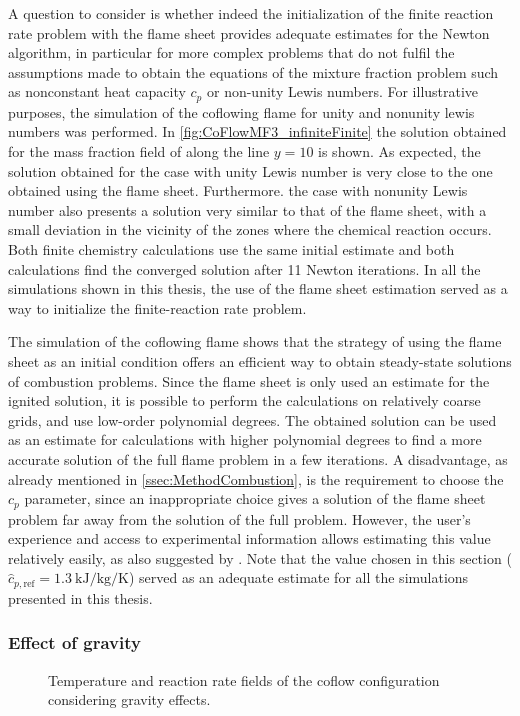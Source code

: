 A question to consider is whether indeed the initialization of the finite reaction rate problem with the flame sheet provides adequate estimates for the Newton algorithm, in particular for more complex problems that do not fulfil the assumptions made to obtain the equations of the mixture fraction problem such as nonconstant heat capacity $c_p$ or non-unity Lewis numbers. 
For illustrative purposes, the simulation of the coflowing flame for unity and nonunity lewis numbers was performed. In \cref{fig:CoFlowMF3_infiniteFinite} the solution obtained for the mass fraction field of  along the line $y=10$ is shown. As expected, the solution obtained for the case with unity Lewis number is very close to the one obtained using the flame sheet. Furthermore. the case with nonunity Lewis number also presents a solution very similar to that of the flame sheet, with a small deviation in the vicinity of the zones where the chemical reaction occurs.  Both finite chemistry calculations use the same initial estimate and both calculations find the converged solution after 11 Newton iterations.
In all the simulations shown in this thesis, the use of the flame sheet estimation served as a way to initialize the finite-reaction rate problem.

The simulation of the coflowing flame shows that the strategy of using the flame sheet as an initial condition offers an efficient way to obtain steady-state solutions of combustion problems. Since the flame sheet is only used an estimate for the ignited solution, it is possible to perform the calculations on relatively coarse grids, and use low-order polynomial degrees. The obtained solution can be used as an estimate for calculations with higher polynomial degrees to find a more accurate solution of the full flame problem in a few iterations. A disadvantage, as already mentioned in \cref{ssec:MethodCombustion}, is the requirement to choose  the $c_p$ parameter, since an inappropriate choice gives a solution of the flame sheet problem far away from the solution of the full problem. However, the user's experience and access to experimental information allows estimating this value relatively easily, as also suggested by \cite{smookeNumericalSolutionTwoDimensional1986a}. Note that the value chosen in this section ($\hat{c}_{p,\text{ref}}= \SI{1.3}{\kilo \joule \per \kilo \gram \per \kelvin}$)  served as an adequate estimate for all the simulations presented in this thesis.  

\subsubsection{Effect of gravity}

\begin{figure}[h!]
	\centering
	\pgfplotsset{width=0.35\textwidth, compat=1.3}
	\caption{Temperature and reaction rate fields of the coflow configuration considering gravity effects.} \label{fig:CoFlowFlameFig}
\end{figure}

